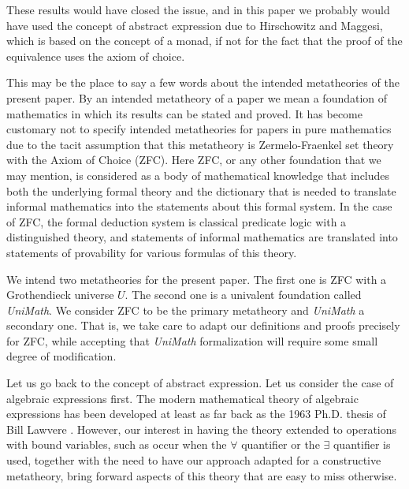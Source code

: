 \documentclass[onecolumn,12pt]{amsart}
\newcommand{\DG}[1]{}
\renewcommand{\DG}[1]{\todo[color=green!30]{DG: #1}\PackageWarning{TODO}{DG: #1}}
\numberwithin{proposition}{subsection}
\begin{document}
These results would have closed the issue, and in
this paper we probably would have used the concept of abstract expression
due to Hirschowitz and Maggesi, which is based
on the concept of a monad, if not for the fact that the proof of the equivalence
uses the axiom of choice.

This may be the place to say a few words about the intended metatheories of
the present paper. By an intended metatheory of a paper we mean a foundation
of mathematics in which its results can be stated and proved. It has become
customary not to specify intended metatheories for papers in pure mathematics
due to the tacit assumption that this metatheory is Zermelo-Fraenkel set
theory with the Axiom of Choice (ZFC).  Here ZFC, or any other foundation that we
may mention, is considered as a body of mathematical knowledge that includes
both the underlying formal theory and the dictionary that is needed to
translate informal mathematics into the statements about this formal system. In
the case of ZFC, the formal deduction system is classical predicate logic
with a distinguished theory, and statements of informal mathematics are
translated into statements of provability for various formulas of this
theory.

We intend two metatheories for the present paper. The first one is 
ZFC with a Grothendieck universe $U$. The second one is a univalent foundation
called {\em UniMath}.  We consider ZFC to be the primary metatheory and {\em UniMath} a
secondary one. That is, we take care to adapt our definitions and proofs
precisely for ZFC, while accepting that {\em UniMath} formalization will require
some small degree of modification.
%

Let us go back to the concept of abstract expression. Let us consider the
case of algebraic expressions first.  The modern mathematical theory of algebraic
expressions has been developed at least as far back as the 1963 Ph.D.{} thesis of
Bill Lawvere \cite{Lawvere}. However, our interest in having the theory
extended to operations with bound variables, such as occur when the $\forall$
quantifier or the $\exists$ quantifier is used,
together with the need to have our approach adapted for a
constructive metatheory, bring forward aspects of this theory that are easy to
miss otherwise.
\end{document}
